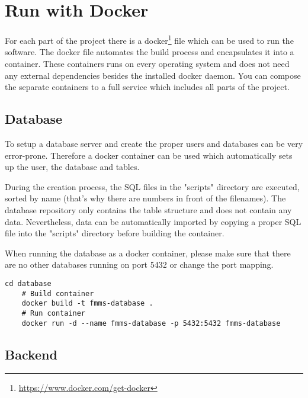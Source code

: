 
\chapter{Run with Docker}
\label{ch:docker}

For each part of the project there is a docker\footnote{\url{https://www.docker.com/get-docker}}  file which can be used to run the software.
The docker file automates the build process and encapsulates it into a container.
These containers runs on every operating system and does not need any external dependencies besides the installed docker daemon.
You can compose the separate containers to a full service which includes all parts of the project.

\section{Database}
\label{docker:db}

To setup a database server and create the proper users and databases can be very error-prone. 
Therefore a docker container can be used which automatically sets up the user, the database and tables.

During the creation process, the SQL files in the "scripts" directory are executed, sorted by name (that's why there are numbers in front of the filenames).
The database repository only contains the table structure and does not contain any data. Nevertheless, data can be automatically imported by copying a proper SQL file into the "scripts" directory before building the container.

When running the database as a docker container, please make sure that there are no other databases running on port 5432 or change the port mapping.

\begin{minipage}{\textwidth}
	\begin{lstlisting}[caption={Build and run Database Container}]
	cd database
	# Build container
	docker build -t fmms-database .
	# Run container
	docker run -d --name fmms-database -p 5432:5432 fmms-database
	\end{lstlisting}
\end{minipage}

\section{Backend}
\label{docker:backend}

